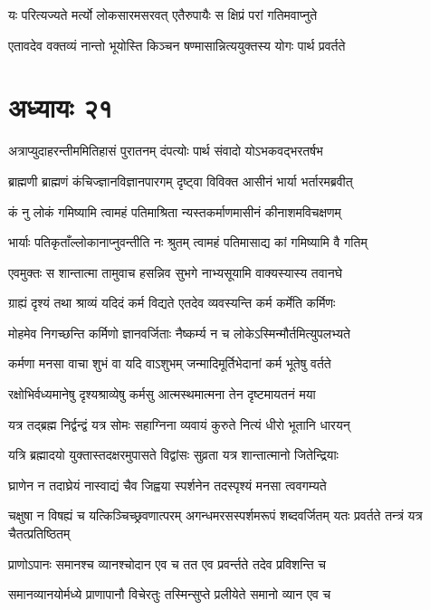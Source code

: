 \twolineshloka
{यः परित्यज्यते मर्त्यो लोकसारमसरवत्}
{एतैरुपायैः स क्षिप्रं परां गतिमवाप्नुते}


\twolineshloka
{एतावदेव वक्तव्यं नान्तो भूयोस्ति किञ्चन}
{षण्मासान्नित्ययुक्तस्य योगः पार्थ प्रवर्तते}


\chapter{अध्यायः २१}
\twolineshloka
{अत्राप्युदाहरन्तीममितिहासं पुरातनम्}
{दंपत्योः पार्थ संवादो योऽभकवद्भरतर्षभ}


\twolineshloka
{ब्राह्मणी ब्राह्मणं कंचिज्ज्ञानविज्ञानपारगम्}
{दृष्ट्वा विविक्त आसीनं भार्या भर्तारमब्रवीत्}


\twolineshloka
{कं नु लोकं गमिष्यामि त्वामहं पतिमाश्रिता}
{न्यस्तकर्माणमासीनं कीनाशमविचक्षणम्}


\twolineshloka
{भार्याः पतिकृताँल्लोकानाप्नुवन्तीति नः श्रुतम्}
{त्वामहं पतिमासाद्य कां गमिष्यामि वै गतिम्}


\twolineshloka
{एवमुक्तः स शान्तात्मा तामुवाच हसन्निव}
{सुभगे नाभ्यसूयामि वाक्यस्यास्य तवानघे}


\twolineshloka
{ग्राह्यं दृश्यं तथा श्राव्यं यदिदं कर्म विद्यते}
{एतदेव व्यवस्यन्ति कर्म कर्मेति कर्मिणः}


\twolineshloka
{मोहमेव निगच्छन्ति कर्मिणो ज्ञानवर्जिताः}
{नैष्कर्म्य न च लोकेऽस्मिन्मौर्तमित्युपलभ्यते}


\twolineshloka
{कर्मणा मनसा वाचा शुभं वा यदि वाऽशुभम्}
{जन्मादिमूर्तिभेदानां कर्म भूतेषु वर्तते}


\twolineshloka
{रक्षोभिर्वध्यमानेषु दृश्यश्राव्येषु कर्मसु}
{आत्मस्थमात्मना तेन दृष्टमायतनं मया}


\twolineshloka
{यत्र तद्ब्रह्म निर्द्वन्द्वं यत्र सोमः सहाग्निना}
{व्यवायं कुरुते नित्यं धीरो भूतानि धारयन्}


\twolineshloka
{यत्रि ब्रह्मादयो युक्तास्तदक्षरमुपासते}
{विद्वांसः सुव्रता यत्र शान्तात्मानो जितेन्द्रियाः}


\twolineshloka
{घ्राणेन न तदाघ्रेयं नास्वाद्यं चैव जिह्वया}
{स्पर्शनेन तदस्पृश्यं मनसा त्ववगम्यते}


\threelineshloka
{चक्षुषा न विषह्यं च यत्किञ्चिच्छ्रवणात्परम्}
{अगन्धमरसस्पर्शमरूपं शब्दवर्जितम्}
{यतः प्रवर्तते तन्त्रं यत्र चैतत्प्रतिष्ठितम्}


\twolineshloka
{प्राणोऽपानः समानश्च व्यानश्चोदान एव च}
{तत एव प्रवर्न्तते तदेव प्रविशन्ति च}


\twolineshloka
{समानव्यानयोर्मध्ये प्राणापानौ विचेरतुः}
{तस्मिन्सुप्ते प्रलीयेते समानो व्यान एव च}



